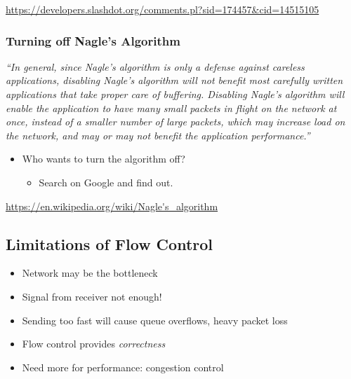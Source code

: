 \url{https://developers.slashdot.org/comments.pl?sid=174457&cid=14515105}

\subsubsection{Turning off Nagle's Algorithm}
\emph{``In general, since Nagle's algorithm is only a defense against careless applications, disabling Nagle’s algorithm will not benefit most carefully written applications that take proper care of buffering. Disabling Nagle’s algorithm will enable the application to have many small packets in flight on the network at once, instead of a smaller number of large packets, which may increase load on the network, and may or may not benefit the application performance.''}

\begin{itemize}[nosep]
    \item Who wants to turn the algorithm off?
          \begin{itemize}[nosep]
              \item Search on Google and find out.
          \end{itemize}
\end{itemize}
\url{https://en.wikipedia.org/wiki/Nagle's_algorithm}

\subsection{Limitations of Flow Control}
\begin{itemize}[nosep]
    \item Network may be the bottleneck
    \item Signal from receiver not enough!
    \item Sending too fast will cause queue overflows, heavy packet loss
    \item Flow control provides \emph{correctness}
    \item Need more for performance: congestion control
\end{itemize}

